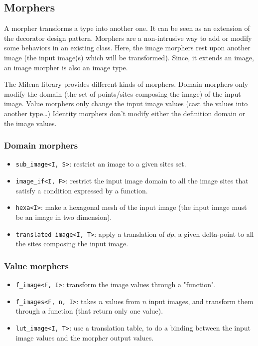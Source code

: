 \subsection{Morphers}

A morpher transforms a type into another one.
It can be seen as an extension of the decorator design pattern.
Morphers are a non-intrusive way to add or modify some behaviors in an
existing class.
Here, the image morphers rest upon another image (the input image(s) which
will be transformed).
Since, it extends an image, an image morpher is also an image type.

The Milena library provides different kinds of morphers.
Domain morphers only modify the domain (the set of points/sites composing the image) of the input image.
Value morphers only change the input image values (cast the values into another
type\ldots{})
Identity morphers don't modify either the definition domain or the image
values.



\subsubsection{Domain morphers}

\begin{itemize}

\item{\verb+sub_image<I, S>+:} restrict an image to a given sites set.

\item{\verb+image_if<I, F>+:} restrict the input image domain to all the image
sites that satisfy a condition expressed by a function.

\item{\verb+hexa<I>+:}  make a hexagonal mesh of the input image (the input
image must be an image in two dimension).

\item{\verb+translated image<I, T>+:} apply a translation of $dp$, a given
delta-point to all the sites composing the input image.
\end{itemize}

\subsubsection{Value morphers}

\begin{itemize}

\item{\verb+f_image<F, I>+:} transform the image values through a "function".

\item{\verb+f_images<F, n, I>+:} takes $n$ values from $n$ input images,
and transform them through a function (that return only one value).

\item{\verb+lut_image<I, T>+:} use a translation table, to do a binding between the input image values and the morpher output values.

\end{itemize}


